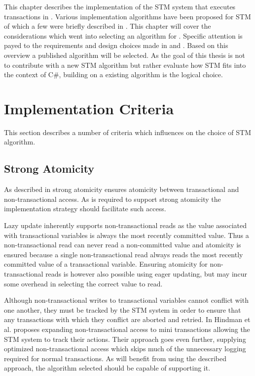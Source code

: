 \makeatletter {}\makeatother
{}
This chapter describes the implementation of the \ac{STM} system that executes transactions in \stmname. Various implementation algorithms have been proposed for \ac{STM} of which a few were briefly described in . This chapter will cover the considerations which went into selecting an algorithm for \stmname. Specific attention is payed to the requirements and design choices made in  and . Based on this overview a published algorithm will be selected. As the goal of this thesis is not to contribute with a new \ac{STM} algorithm but rather evaluate how \ac{STM} fits into the context of C\#, building on a existing algorithm is the logical choice. 
\label{chap:implementation}
\section{Implementation Criteria}
\label{sec:stm_impl_criteria}
This section describes a number of criteria which influences on the choice of \ac{STM} algorithm.

\subsection{Strong Atomicity}
As described in  strong atomicity ensures atomicity between transactional and non-transactional access. As \stmnamesp is required to support strong atomicity the implementation strategy should facilitate such access.

Lazy update inherently supports non-transactional reads as the value associated with transactional variables is always the most recently committed value\cite[p. 2084]{herlihy2011tm}\cite[p. 21]{harris2010transactional}. Thus a non-transactional read can never read a non-committed value and atomicity is ensured because a single non-transactional read always reads the most recently committed value of a transactional variable. Ensuring atomicity for non-transactional reads is however also possible using eager updating, but may incur some overhead in selecting the correct value to read. 

Although non-transactional writes to transactional variables cannot conflict with one another, they must be tracked by the \ac{STM} system in order to ensure that any transactions with which they conflict are aborted and retried. In \cite{hindman2006atomicity} Hindman et al. proposes expanding non-transactional access to mini transactions allowing the \ac{STM} system to track their actions. Their approach goes even further, supplying optimized non-transactional access which skips much of the unnecessary logging required for normal transactions. As \stmnamesp will benefit from using the described approach, the algorithm selected should be capable of supporting it.
 
